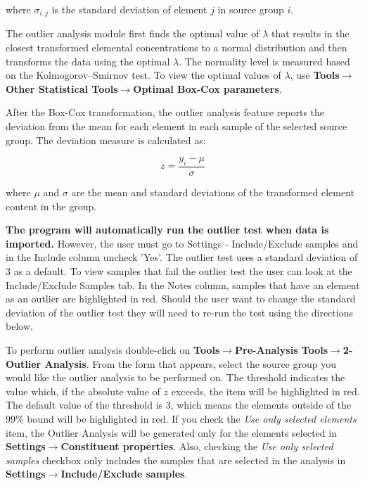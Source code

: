 \documentclass[12pt]{report}
\begin{document}
where $\sigma_{i,j}$ is the standard deviation of element $j$ in source group $i$.

The outlier analysis module first finds the optimal value of $\lambda$ that results in the closest transformed elemental concentrations to a normal distribution and then transforms the data using the optimal $\lambda$. The normality level is measured based on the Kolmogorov–Smirnov test. To view the optimal values of $\lambda$, use \textbf{Tools}$\rightarrow$\textbf{Other Statistical Tools}$\rightarrow$\textbf{Optimal Box-Cox parameters}.

After the Box-Cox transformation, the outlier analysis feature reports the deviation from the mean for each element in each sample of the selected source group. The deviation measure is calculated as:

\begin{equation}
    z = \frac{y_i-\mu}{\sigma}
\end{equation}

where $\mu$ and $\sigma$ are the mean and standard deviations of the transformed element content in the group. 

\textbf{The program will automatically run the outlier test when data is imported.} However, the user must go to Settings - Include/Exclude samples and in the Include column uncheck 'Yes'.  The outlier test uses a standard deviation of 3 as a default. To view samples that fail the outlier test the user can look at the Include/Exclude Samples tab.  In the Notes column, samples that have an element as an outlier are highlighted in red. Should the user want to change the standard deviation of the outlier test they will need to re-run the test using the directions below. 

To perform outlier analysis double-click on \textbf{Tools}$\rightarrow$\textbf{Pre-Analysis Tools}$\rightarrow$\textbf{2-Outlier Analysis}. From the form that appears, select the source group you would like the outlier analysis to be performed on. The threshold indicates the value which, if the absolute value of $z$ exceeds, the item will be highlighted in red. The default value of the threshold is 3, which means the elements outside of the 99\% bound will be highlighted in red. If you check the \textit{Use only selected elements} item, the Outlier Analysis will be generated only for the elements selected in \textbf{Settings}$\rightarrow$\textbf{Constituent properties}. Also, checking the \textit{Use only selected samples} checkbox only includes the samples that are selected in the analysis in \textbf{Settings}$\rightarrow$\textbf{Include/Exclude samples}.
\end{document}
